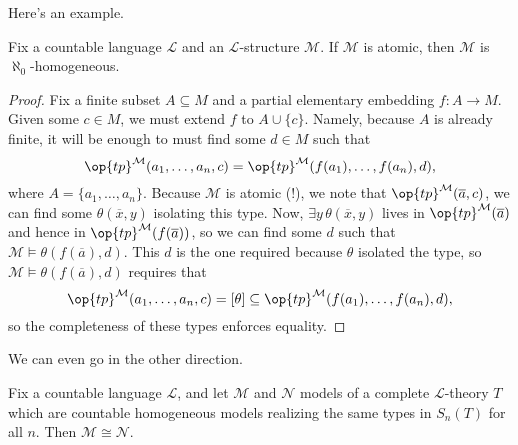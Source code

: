 \documentclass[../notes.tex]{subfiles}
\begin{document}
Here's an example.
\begin{lemma}
	Fix a countable language $\mathcal L$ and an $\mathcal L$-structure $\mathcal M$. If $\mathcal M$ is atomic, then $\mathcal M$ is $\aleph_0$-homo\-geneous.
\end{lemma}
\begin{proof}
	Fix a finite subset $A\subseteq M$ and a partial elementary embedding $f\colon A\to M$. Given some $c\in M$, we must extend $f$ to $A\cup\{c\}$. Namely, because $A$ is already finite, it will be enough to must find some $d\in M$ such that
	\[\op{tp}^\mathcal M(a_1,\ldots,a_n,c)=\op{tp}^\mathcal M(f(a_1),\ldots,f(a_n),d),\]
	where $A=\{a_1,\ldots,a_n\}$. Because $\mathcal M$ is atomic (!), we note that $\op{tp}^\mathcal M(\overline a,c)$, we can find some $\theta(\overline x,y)$ isolating this type. Now, $\exists y\,\theta(\overline x,y)$ lives in $\op{tp}^\mathcal M(\overline a)$ and hence in $\op{tp}^\mathcal M(f(\overline a))$, so we can find some $d$ such that $\mathcal M\models\theta(f(\overline a),d)$. This $d$ is the one required because $\theta$ isolated the type, so $\mathcal M\models\theta(f(\overline a),d)$ requires that
	\[\op{tp}^\mathcal M(a_1,\ldots,a_n,c)=[\theta]\subseteq\op{tp}^\mathcal M(f(a_1),\ldots,f(a_n),d),\]
	so the completeness of these types enforces equality.
\end{proof}
We can even go in the other direction.
\begin{theorem}
	Fix a countable language $\mathcal L$, and let $\mathcal M$ and $\mathcal N$ models of a complete $\mathcal L$-theory $T$ which are countable homogeneous models realizing the same types in $S_n(T)$ for all $n$. Then $\mathcal M\cong\mathcal N$.
\end{theorem}
\end{document}
